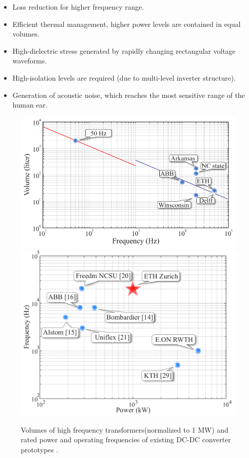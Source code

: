 \documentclass[a4paper, 11pt]{article} %
\begin{document}
\begin{itemize}
\item Loss reduction for higher frequency range.
\item Efficient thermal management, higher power levels are contained in equal
volumes.
\item High-dielectric stress generated by rapidly changing rectangular voltage waveforms.
\item High-isolation levels are required (due to multi-level inverter structure).
\item Generation of acoustic noise, which reaches the most sensitive range of the human ear.
\end{itemize}


\begin{figure}[]
  \centering
    \includegraphics[scale=0.3]{transformer_volume}
    \includegraphics[scale=0.25]{transformer_frequency_commercial_orbitz2010a}
    \caption{Volumes of high frequency transformers(normalized to 1 MW) and rated power and operating frequencies of existing DC-DC converter prototypes \cite{Ortiz2010a,Ortiz2010}.}
  \label{transformer-vols}
\end{figure}
\end{document}
